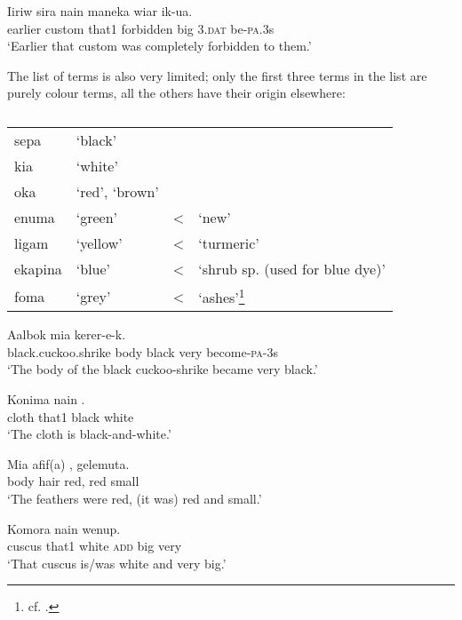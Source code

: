 \ea%
\label{ex:x1759}
\gll Iiriw sira nain  maneka wiar ik-ua. \\
earlier custom that1 forbidden big 3.\textsc{dat} be-\textsc{pa}.3s\\
\glt`Earlier that custom was completely forbidden to them.'
\z

The list of  terms is also very limited; only the first three terms in the list are purely colour terms, all the others have their origin elsewhere:

\begin{table}
\caption{}
\label{} 
\begin{tabular}{llcl}
sepa &`black'&&\\
kia &`white'&&\\
oka &`red', `brown'&&\\
enuma &`green' &{\textless} &`new'\\
ligam &`yellow' &{\textless} &`turmeric'\\
ekapina &`blue' &{\textless} &`shrub sp. (used for blue dye)'\\
foma &`grey' &{\textless} &`ashes'\footnote{cf. \cite[4]{BerlinandKay1969}.}\\
\end{tabular}

\end{table}

\ea%
\label{ex:x1753}
\gll Aalbok mia    kerer-e-k. \\
black.cuckoo.shrike body black very become-\textsc{pa}-3s\\
\glt`The body of the black cuckoo-shrike became very black.'
\z

\ea%
\label{ex:x109}
\gll Konima nain  . \\
cloth that1 black white\\
\glt`The cloth is black-and-white.'
\z

\ea%
\label{ex:x1754}
\gll Mia afif(a) ,  gelemuta. \\
body hair red, red small\\
\glt`The feathers were red, (it was) red and small.'
\z

\ea%
\label{ex:x1755}
\gll Komora nain    wenup. \\
cuscus that1 white \textsc{add} big very\\
\glt`That cuscus is/was white and very big.'
\z

